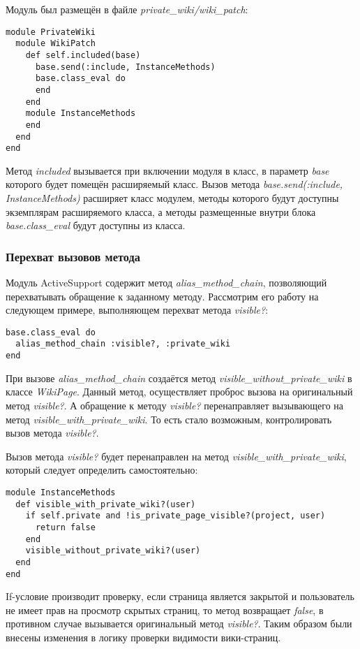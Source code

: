 Модуль был размещён в файле \textit{private\_wiki/wiki\_patch}:
\small{\begin{lstlisting}
module PrivateWiki
  module WikiPatch
    def self.included(base)
      base.send(:include, InstanceMethods)
      base.class_eval do
      end
    end
    module InstanceMethods
    end
  end
end
\end{lstlisting}}
Метод \textit{included} вызывается при включении модуля в класс, в параметр
\textit{base} которого будет помещён расширяемый класс. Вызов метода
\textit{base.send(:include, InstanceMethods)} расширяет класс модулем, методы
которого будут доступны экземплярам расширяемого класса, а методы размещенные
внутри блока \textit{base.class\_eval} будут доступны из класса.

\subsubsection{Перехват вызовов метода}
Модуль ActiveSupport содержит метод \textit{alias\_method\_chain}, позволяющий
перехватывать обращение к заданному методу. Рассмотрим его работу на следующем
примере, выполняющем перехват метода \textit{visible?}:
\small{\begin{lstlisting}
base.class_eval do
  alias_method_chain :visible?, :private_wiki
end
\end{lstlisting}}
При вызове \textit{alias\_method\_chain} создаётся метод
\textit{visible\_without\_private\_wiki} в классе \textit{WikiPage}. Данный
метод, осуществляет проброс вызова на оригинальный метод \textit{visible?}. А
обращение к методу \textit{visible?} перенаправляет вызывающего на метод
\textit{visible\_with\_private\_wiki}. То есть стало возможным, контролировать
вызов метода \textit{visible?}.

Вызов метода \textit{visible?} будет перенаправлен на метод
\textit{visible\_with\_private\_wiki}, который следует определить
самостоятельно:
\small{\begin{lstlisting}
module InstanceMethods
  def visible_with_private_wiki?(user)
    if self.private and !is_private_page_visible?(project, user)
      return false
    end
    visible_without_private_wiki?(user)
  end
end
\end{lstlisting}}
If-условие производит проверку, если страница является закрытой и пользователь
не имеет прав на просмотр скрытых страниц, то метод возвращает \textit{false},
в противном случае вызывается оригинальный метод \textit{visible?}. Таким
образом были внесены изменения в логику проверки видимости вики-страниц.

